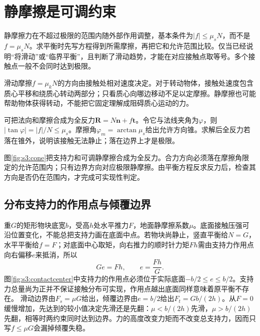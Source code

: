 \section{静摩擦是可调约束}
静摩擦力在不超过极限的范围内随外部作用调整，基本条件为$|f|\le\mu_sN$，而不是$f=\mu_sN$。求平衡时先写方程得到所需摩擦，再把它和允许范围比较。仅当已经说明“将滑动”或“临界平衡”，且判断了滑动趋势，才能在对应接触点取等号。多个接触点一般不会同时达到极限。

滑动摩擦$f=\mu_kN$的方向由接触处相对速度决定。对于转动物体，接触处速度包含质心平移和绕质心转动两部分；只看质心向哪边移动不足以定摩擦。静摩擦也可能帮助物体获得转动，不能把它固定理解成阻碍质心运动的力。

可把法向和摩擦合成为全反力$\boldsymbol R=N\boldsymbol n+f\boldsymbol t$。令它与法线夹角为$\varphi$，则$|\tan\varphi|=|f|/N\le\mu_s$。摩擦角$\varphi_m=\arctan\mu_s$给出允许方向锥。求解后全反力若落在锥外，说明该接触无法静止；落在边界上才是极限。


图\ref{fig:s3:cone}把支持力和可调静摩擦合成为全反力。合力方向必须落在摩擦角限定的允许范围内；只有边界方向对应极限静摩擦。由平衡方程反求反力后，检查其方向是否仍在范围内，才完成可实现性判定。

\subsection{分布支持力的作用点与倾覆边界}
重$G$的矩形物块底宽$b$，受高$h$处水平推力$F$，地面静摩擦系数$\mu$。底面接触压强可沿位置变化，不能总把支持力画在底面中点。若物块尚静止，竖直平衡给$N=G$，水平平衡给$f=F$；对底面中心取矩，向右推力的顺时针力矩$Fh$需由支持力作用点向右偏移$e$来抵消，所以
\[
Ge=Fh,\qquad e=\frac{Fh}{G}.
\]
图\ref{fig:s3:contactcenter}中支持力的作用点必须位于实际底面$-b/2\le e\le b/2$。支持力总量尚为正并不保证接触分布可实现，作用点越出底面同样意味着原平衡不存在。
滑动边界由$F_s=\mu G$给出，倾覆边界由$e=b/2$给出$F_t=Gb/(2h)$。从$F=0$缓慢增加，先达到的较小值决定先滑还是先翻：$\mu<b/(2h)$先滑，$\mu>b/(2h)$先翻，相等时两约束同时达到边界。力的高度改变力矩而不改变总支持力，因而只写$f\le\mu G$会漏掉倾覆失稳。


